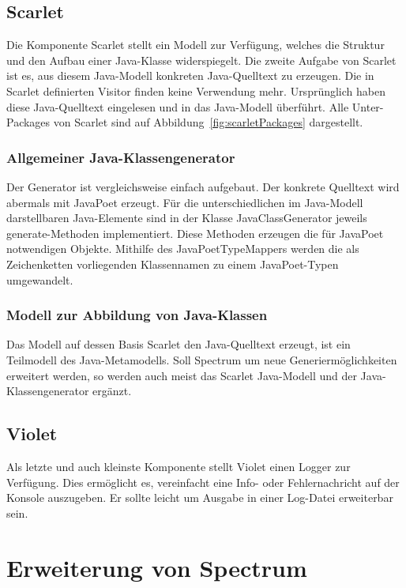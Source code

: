 \documentclass[12pt,oneside,a4paper,parskip]{scrbook}
\begin{document}
\subsection{Scarlet}

Die Komponente Scarlet stellt ein Modell zur Verfügung, welches die Struktur und den Aufbau einer Java-Klasse widerspiegelt. Die zweite Aufgabe von Scarlet ist es, aus diesem Java-Modell konkreten Java-Quelltext zu erzeugen. Die in Scarlet definierten Visitor finden keine Verwendung mehr. Ursprünglich haben diese Java-Quelltext eingelesen und in das Java-Modell überführt. Alle Unter-Packages von Scarlet sind auf Abbildung~\ref{fig:scarletPackages} dargestellt.

\subsubsection{Allgemeiner Java-Klassengenerator}

Der Generator ist vergleichsweise einfach aufgebaut. Der konkrete Quelltext wird abermals mit JavaPoet erzeugt. Für die unterschiedlichen im Java-Modell darstellbaren Java-Elemente sind in der Klasse JavaClassGenerator jeweils generate-Methoden implementiert. Diese Methoden erzeugen die für JavaPoet notwendigen Objekte. Mithilfe des JavaPoetTypeMappers werden die als Zeichenketten vorliegenden Klassennamen zu einem JavaPoet-Typen umgewandelt.

\subsubsection{Modell zur Abbildung von Java-Klassen}

Das Modell auf dessen Basis Scarlet den Java-Quelltext erzeugt, ist ein Teilmodell des Java-Metamodells. Soll Spectrum um neue Generiermöglichkeiten erweitert werden, so werden auch meist das Scarlet Java-Modell und der Java-Klassengenerator ergänzt.

\subsection{Violet}

Als letzte und auch kleinste Komponente stellt Violet einen Logger zur Verfügung. Dies ermöglicht es, vereinfacht eine Info- oder Fehlernachricht auf der Konsole auszugeben. Er sollte leicht um Ausgabe in einer Log-Datei erweiterbar sein.

\section{Erweiterung von Spectrum}
\end{document}
